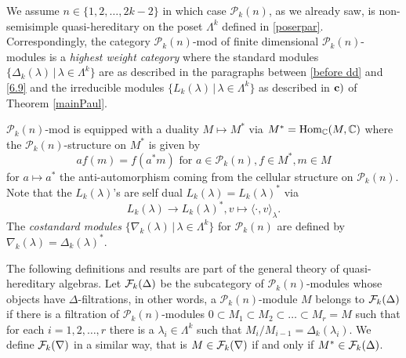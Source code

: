 \documentclass[10pt,hidelinks]{article}
\newcommand{\ParAlg}{{\mathcal P }_{k}}
\newcommand{\CC}{ \mathbb C }
\newcommand{\Hom}{{\rm Hom}}
\numberwithin{equation}{section}
\begin{document}
\medskip
We assume $ n \in \{1,2,\ldots, 2k-2\} $
in which case $   \ParAlg(n) $, as we already saw, is non-semisimple quasi-hereditary on the poset $ \Lambda^k $
defined in \eqref{poserpar}. Correspondingly, the category $ \ParAlg(n) $-mod of finite dimensional 
$ \ParAlg(n) $-modules is a {\it highest weight category} where the 
standard modules $ \{ \Delta_k(\lambda) \, | \, \lambda \in 
\Lambda^k \} $ are as described in the paragraphs between \eqref{before dd} and \eqref{6.9} and
the irreducible
modules $ \{ L_k(\lambda) \, | \, \lambda \in 
\Lambda^k \} $ as described in $ { \bf c)} $ of Theorem \ref{mainPaul}.

\medskip
$ \ParAlg(n) $-mod is equipped with a duality $ M \mapsto M^{\ast} $ via 
$ M^{\ast} = \Hom_{\CC}(M, \CC) $ where the $    \ParAlg(n) $-structure on $ M^{\ast} $ is given by 
\begin{equation}
af(m) = f(a^{\ast} m)  \mbox{ for } a \in  \ParAlg(n), f \in M^{\ast},  m \in M
\end{equation}
for $ a \mapsto a^{\ast} $ the anti-automorphism coming from the cellular structure on $    \ParAlg(n) $. 
Note that the $L_k(\lambda) $'s are self dual $ L_k(\lambda) = L_k(\lambda)^{\ast}$ via 
\begin{equation}
L_k(\lambda) \rightarrow L_k(\lambda)^{\ast}, v \mapsto  \langle \cdot , v \rangle_{\lambda} .
\end{equation}
The {\it costandard modules}
$ \{ \nabla_k(\lambda)   \, | \,  \lambda \in \Lambda^k \}$
for $    \ParAlg(n) $ are defined by $ \nabla_k(\lambda) = \Delta_k(\lambda)^{\ast}$.

\medskip
The following definitions and results are part of the general theory of quasi-hereditary algebras. 
Let $ {\cal F}_k(\Delta) $ be the subcategory of $   \ParAlg(n) $-modules
whose objects have $ \Delta$-filtrations, 
in other words, a $   \ParAlg(n) $-module $ M $ belongs to $ {\cal F}_k(\Delta) $ if there is a filtration
of $   \ParAlg(n) $-modules $ 0 \subset M_1 \subset M_2 \subset \ldots \subset M_r = M $ such
that for each $ i=1,2,\ldots, r $ there is a $ \lambda_i \in \Lambda^k$
such that 
$ M_i / M_{i-1} = \Delta_k(\lambda_i ) $.
We define $ {\cal F}_k(\nabla) $ in a similar way, that is $ M\in {\cal F}_k(\nabla) $ if and only if 
$ M^{\ast} \in  {\cal F}_k(\Delta) $. 
\end{document}
